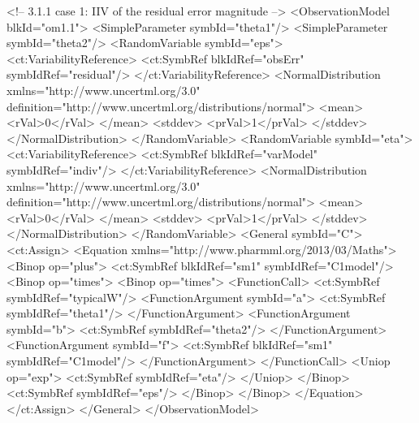 \documentclass[a4paper,10pt]{article}
\begin{document}
\begin{xmlcode}
<!-- 3.1.1  case 1: IIV of the residual error magnitude -->
<ObservationModel blkId="om1.1">
    <SimpleParameter symbId="theta1"/>
    <SimpleParameter symbId="theta2"/>
    <RandomVariable symbId="eps">
        <ct:VariabilityReference>
            <ct:SymbRef blkIdRef="obsErr" symbIdRef="residual"/>
        </ct:VariabilityReference>
        <NormalDistribution xmlns="http://www.uncertml.org/3.0" definition="http://www.uncertml.org/distributions/normal">
            <mean>
                <rVal>0</rVal>
            </mean>
            <stddev>
                <prVal>1</prVal>
            </stddev>
        </NormalDistribution>
    </RandomVariable>
    <RandomVariable symbId="eta">
        <ct:VariabilityReference>
            <ct:SymbRef blkIdRef="varModel" symbIdRef="indiv"/>
        </ct:VariabilityReference>
        <NormalDistribution xmlns="http://www.uncertml.org/3.0" definition="http://www.uncertml.org/distributions/normal">
            <mean>
                <rVal>0</rVal>
            </mean>
            <stddev>
                <prVal>1</prVal>
            </stddev>
        </NormalDistribution>
    </RandomVariable>
    <General symbId="C">
        <ct:Assign>
            <Equation xmlns="http://www.pharmml.org/2013/03/Maths">
                <Binop op="plus">
                    <ct:SymbRef blkIdRef="sm1" symbIdRef="C1model"/>
                    <Binop op="times">
                        <Binop op="times">
                            <FunctionCall>
                                <ct:SymbRef symbIdRef="typicalW"/>
                                <FunctionArgument symbId="a">
                                    <ct:SymbRef symbIdRef="theta1"/>
                                </FunctionArgument>
                                <FunctionArgument symbId="b">
                                    <ct:SymbRef symbIdRef="theta2"/>
                                </FunctionArgument>
                                <FunctionArgument symbId="f">
                                    <ct:SymbRef blkIdRef="sm1" symbIdRef="C1model"/>
                                </FunctionArgument>
                            </FunctionCall>
                            <Uniop op="exp">
                                <ct:SymbRef symbIdRef="eta"/>
                            </Uniop>
                        </Binop>
                        <ct:SymbRef symbIdRef="eps"/>
                    </Binop>
                </Binop>
            </Equation>
        </ct:Assign>
    </General>
</ObservationModel>
\end{xmlcode}
\end{document}
